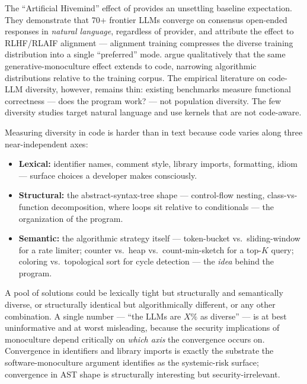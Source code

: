\documentclass{article}
\begin{document}
The ``Artificial Hivemind'' effect of \citet{jiang2025hivemind} provides an
unsettling baseline expectation. They demonstrate that 70+ frontier LLMs
converge on consensus open-ended responses in \emph{natural language},
regardless of provider, and attribute the effect to RLHF/RLAIF alignment ---
alignment training compresses the diverse training distribution into a single
``preferred'' mode. \citet{wu2024monoculture} argue qualitatively that the
same generative-monoculture effect extends to code, narrowing algorithmic
distributions relative to the training corpus. The empirical literature on
code-LLM diversity, however, remains thin: existing benchmarks
\citep{chen2021humaneval,austin2021mbpp,liu2023evalplus,zhuo2025bigcodebench,
jain2024livecodebench} measure functional correctness ---
does the program work? --- not population diversity. The few diversity studies
\citep{padmakumar2024writing,friedman2023vendi} target natural language and
use kernels that are not code-aware.

Measuring diversity in code is harder than in text because code varies along
three near-independent axes:

\begin{itemize}[leftmargin=*]
  \item \textbf{Lexical:} identifier names, comment style, library imports,
    formatting, idiom --- surface choices a developer makes consciously.
  \item \textbf{Structural:} the abstract-syntax-tree shape --- control-flow
    nesting, class-vs-function decomposition, where loops sit relative to
    conditionals --- the organization of the program.
  \item \textbf{Semantic:} the algorithmic strategy itself --- token-bucket
    vs.\ sliding-window for a rate limiter; counter vs.\ heap vs.\
    count-min-sketch for a top-$K$ query; coloring vs.\ topological sort for
    cycle detection --- the \emph{idea} behind the program.
\end{itemize}

A pool of solutions could be lexically tight but structurally and semantically
diverse, or structurally identical but algorithmically different, or any other
combination. A single number --- ``the LLMs are $X\%$ as diverse'' --- is at
best uninformative and at worst misleading, because the security implications
of monoculture depend critically on \emph{which axis} the convergence occurs
on. Convergence in identifiers and library imports is exactly the substrate
the software-monoculture argument identifies as the systemic-risk surface;
convergence in AST shape is structurally interesting but security-irrelevant.
\end{document}
